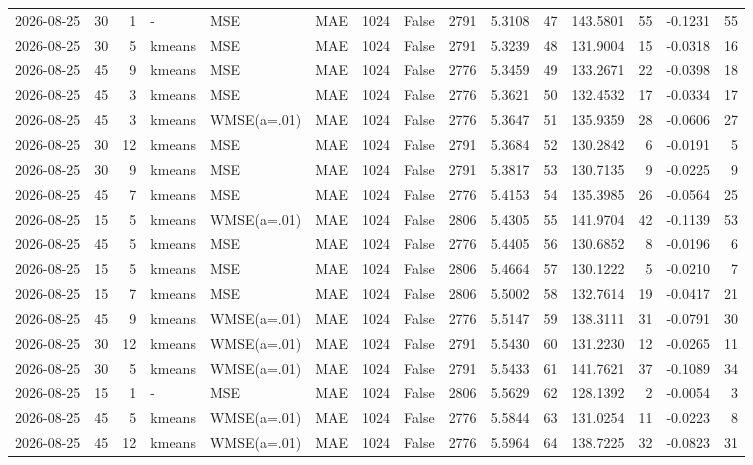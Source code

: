 \documentclass[10pt]{article}
\begin{document}
\begin{landscape}
\begin{longtable}{@{}lrrlllrcrrrrrrr@{}}
2026-08-25 & 30 & 1 & - & MSE & MAE & 1024 & False & 2791 & 5.3108 & 47 & 143.5801 & 55 & -0.1231 & 55 \\
2026-08-25 & 30 & 5 & kmeans & MSE & MAE & 1024 & False & 2791 & 5.3239 & 48 & 131.9004 & 15 & -0.0318 & 16 \\
2026-08-25 & 45 & 9 & kmeans & MSE & MAE & 1024 & False & 2776 & 5.3459 & 49 & 133.2671 & 22 & -0.0398 & 18 \\
2026-08-25 & 45 & 3 & kmeans & MSE & MAE & 1024 & False & 2776 & 5.3621 & 50 & 132.4532 & 17 & -0.0334 & 17 \\
2026-08-25 & 45 & 3 & kmeans & WMSE(a=.01) & MAE & 1024 & False & 2776 & 5.3647 & 51 & 135.9359 & 28 & -0.0606 & 27 \\
2026-08-25 & 30 & 12 & kmeans & MSE & MAE & 1024 & False & 2791 & 5.3684 & 52 & 130.2842 & 6 & -0.0191 & 5 \\
2026-08-25 & 30 & 9 & kmeans & MSE & MAE & 1024 & False & 2791 & 5.3817 & 53 & 130.7135 & 9 & -0.0225 & 9 \\
2026-08-25 & 45 & 7 & kmeans & MSE & MAE & 1024 & False & 2776 & 5.4153 & 54 & 135.3985 & 26 & -0.0564 & 25 \\
2026-08-25 & 15 & 5 & kmeans & WMSE(a=.01) & MAE & 1024 & False & 2806 & 5.4305 & 55 & 141.9704 & 42 & -0.1139 & 53 \\
2026-08-25 & 45 & 5 & kmeans & MSE & MAE & 1024 & False & 2776 & 5.4405 & 56 & 130.6852 & 8 & -0.0196 & 6 \\
2026-08-25 & 15 & 5 & kmeans & MSE & MAE & 1024 & False & 2806 & 5.4664 & 57 & 130.1222 & 5 & -0.0210 & 7 \\
2026-08-25 & 15 & 7 & kmeans & MSE & MAE & 1024 & False & 2806 & 5.5002 & 58 & 132.7614 & 19 & -0.0417 & 21 \\
2026-08-25 & 45 & 9 & kmeans & WMSE(a=.01) & MAE & 1024 & False & 2776 & 5.5147 & 59 & 138.3111 & 31 & -0.0791 & 30 \\
2026-08-25 & 30 & 12 & kmeans & WMSE(a=.01) & MAE & 1024 & False & 2791 & 5.5430 & 60 & 131.2230 & 12 & -0.0265 & 11 \\
2026-08-25 & 30 & 5 & kmeans & WMSE(a=.01) & MAE & 1024 & False & 2791 & 5.5433 & 61 & 141.7621 & 37 & -0.1089 & 34 \\
2026-08-25 & 15 & 1 & - & MSE & MAE & 1024 & False & 2806 & 5.5629 & 62 & 128.1392 & 2 & -0.0054 & 3 \\
2026-08-25 & 45 & 5 & kmeans & WMSE(a=.01) & MAE & 1024 & False & 2776 & 5.5844 & 63 & 131.0254 & 11 & -0.0223 & 8 \\
2026-08-25 & 45 & 12 & kmeans & WMSE(a=.01) & MAE & 1024 & False & 2776 & 5.5964 & 64 & 138.7225 & 32 & -0.0823 & 31 \\

\end{longtable}
\end{landscape}
\end{document}
